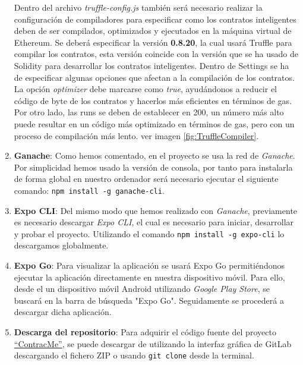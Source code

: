 \begin{enumerate}

Dentro del archivo \textit{truffle-config.js} también será necesario realizar la configuración de compiladores para especificar como los contratos inteligentes deben de ser compilados, optimizados y ejecutados en la máquina virtual de Ethereum.
Se deberá especificar la versión \textbf{0.8.20}, la cual usará Truffle para compilar los contratos, esta versión coincide con la versión que se ha usado de Solidity para desarrollar los contratos inteligentes.
Dentro de Settings se ha de especificar algunas opciones que afectan a la compilación de los contratos. La opción \textit{optimizer} debe marcarse como \textit{true}, ayudándonos a reducir el código de byte de los contratos y hacerlos más eficientes en términos de gas.
Por otro lado, las runs se deben de establecer en 200, un número más alto puede resultar en un código más optimizado en términos de gas, pero con un proceso de compilación más lento. ver imagen \ref{fig:TruffleCompiler}.


\item \textbf{Ganache}: Como hemos comentado, en el proyecto se usa la red de \textit{Ganache}. Por simplicidad hemos usado la versión de consola, por tanto para instalarla de forma global en nuestro ordenador será necesario ejecutar el siguiente comando: \texttt{npm install -g ganache-cli}.

\item \textbf{Expo CLI}: Del mismo modo que hemos realizado con \textit{Ganache}, previamente es necesario descargar \textit{Expo CLI}, el cual es necesario para iniciar, desarrollar y probar el proyecto.
Utilizando el comando \texttt{npm install -g expo-cli} lo descargamos globalmente.

\item \textbf{Expo Go}: Para visualizar la aplicación se usará Expo Go permitiéndonos ejecutar la aplicación directamente en nuestra dispositivo móvil.
Para ello, desde el un dispositivo móvil Android utilizando \textit{Google Play Store}, se buscará en la barra de búsqueda "Expo Go".  Seguidamente se procederá a descargar dicha aplicación.

\item \textbf{Descarga del repositorio}: Para adquirir el código fuente del proyecto \href{https://gitlab.com/HP-SCDS/Observatorio/2023-2024/contractme/ubu-contractme.git}{``ContracMe''}, se puede descargar de utilizando la interfaz gráfica de GitLab descargando el fichero ZIP o usando \texttt{git clone} desde la terminal.

\end{enumerate}



